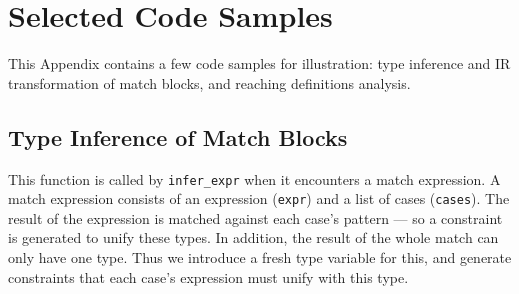 \documentclass[12pt,notitlepage]{report}
\makeatletter
\renewcommand{\@makechapterhead}[1]{%
    \vspace*{35\p@}%
    {\parindent \z@ \raggedright
        \normalfont
        \interlinepenalty\@M
        \Huge \bfseries  #1\par\nobreak
        \vskip 20\p@
}}
\newcommand{\textinline}{\texttt}
\makeatother
\begin{document}
\makeatletter
\renewcommand{\@makechapterhead}[1]{%
    \vspace*{0\p@}%
    {\parindent \z@ \raggedright
        \normalfont
        \interlinepenalty\@M
        \Huge \bfseries  #1\par\nobreak
        \vskip 15\p@
}}
\makeatother

\chapter{Selected Code Samples}
\thispagestyle{headings}
This Appendix contains a few code samples for illustration: type inference and IR transformation of match blocks, and reaching definitions analysis.

\section{Type Inference of Match Blocks}
\label{sample:typematch}
This function is called by \textinline{infer_expr} when it encounters a match expression. A match expression consists of an expression (\textinline{expr}) and a list of cases (\textinline{cases}). The result of the expression is matched against each case's pattern --- so a constraint is generated to unify these types. In addition, the result of the whole match can only have one type. Thus we introduce a fresh type variable for this, and generate constraints that each case's expression must unify with this type.
\end{document}
